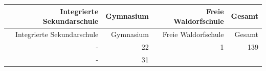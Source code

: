 \documentclass[a4paper,
fontsize=11pt,
oneside,
numbers=noperiodatend,
parskip=half-,
bibliography=totoc,
final
]{scrartcl}
\begin{document}
\begin{longtable}[]{@{}rrrr@{}}
\toprule
\begin{minipage}[b]{0.36\columnwidth}\raggedleft\strut
Integrierte Sekundarschule\strut
\end{minipage} & \begin{minipage}[b]{0.15\columnwidth}\raggedleft\strut
Gymnasium\strut
\end{minipage} & \begin{minipage}[b]{0.27\columnwidth}\raggedleft\strut
Freie Waldorfschule\strut
\end{minipage} & \begin{minipage}[b]{0.10\columnwidth}\raggedleft\strut
Gesamt\strut
\end{minipage}\tabularnewline
\midrule
\endfirsthead
\toprule
\begin{minipage}[b]{0.36\columnwidth}\raggedleft\strut
Integrierte Sekundarschule\strut
\end{minipage} & \begin{minipage}[b]{0.15\columnwidth}\raggedleft\strut
Gymnasium\strut
\end{minipage} & \begin{minipage}[b]{0.27\columnwidth}\raggedleft\strut
Freie Waldorfschule\strut
\end{minipage} & \begin{minipage}[b]{0.10\columnwidth}\raggedleft\strut
Gesamt\strut
\end{minipage}\tabularnewline
\midrule
\endhead
\begin{minipage}[t]{0.36\columnwidth}\raggedleft\strut
-\strut
\end{minipage} & \begin{minipage}[t]{0.15\columnwidth}\raggedleft\strut
22\strut
\end{minipage} & \begin{minipage}[t]{0.27\columnwidth}\raggedleft\strut
1\strut
\end{minipage} & \begin{minipage}[t]{0.10\columnwidth}\raggedleft\strut
139\strut
\end{minipage}\tabularnewline
\begin{minipage}[t]{0.36\columnwidth}\raggedleft\strut
-\strut
\end{minipage} & \begin{minipage}[t]{0.15\columnwidth}\raggedleft\strut
31\strut
\end{minipage} & \begin{minipage}[t]{0.27\columnwidth}\raggedleft\strut

\end{minipage}
\end{longtable}
\end{document}

